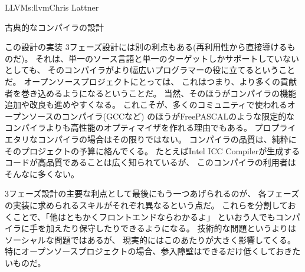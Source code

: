 \begin{aosachapter}{LLVM}{s:llvm}{Chris Lattner}
\begin{aosasect1}{古典的なコンパイラの設計}
\begin{aosasect2}{この設計の実装}
3フェーズ設計には別の利点もある(再利用性から直接導けるものだ)。
それは、単一のソース言語と単一のターゲットしかサポートしていないとしても、
そのコンパイラがより幅広いプログラマーの役に立てるということだ。
オープンソースプロジェクトにとっては、
これはつまり、より多くの貢献者を巻き込めるようになるということだ。
当然、そのほうがコンパイラの機能追加や改良も進めやすくなる。
これこそが、多くのコミュニティで使われるオープンソースのコンパイラ(GCCなど)
のほうがFreePASCALのような限定的なコンパイラよりも高性能のオプティマイザを作れる理由でもある。
プロプライエタリなコンパイラの場合はその限りではない。
コンパイラの品質は、純粋にそのプロジェクトの予算に絡んでくる。
たとえばIntel ICC Compilerが生成するコードが高品質であることは広く知られているが、
このコンパイラの利用者はそんなに多くない。

3フェーズ設計の主要な利点として最後にもう一つあげられるのが、
各フェーズの実装に求められるスキルがそれぞれ異なるという点だ。
これらを分割しておくことで、「他はともかくフロントエンドならわかるよ」
といおう人でもコンパイラに手を加えたり保守したりできるようになる。
技術的な問題というよりはソーシャルな問題ではあるが、
現実的にはこのあたりが大きく影響してくる。
特にオープンソースプロジェクトの場合、参入障壁はできるだけ低くしておきたいものだ。


\end{aosasect2}
\end{aosasect1}
\end{aosachapter}

